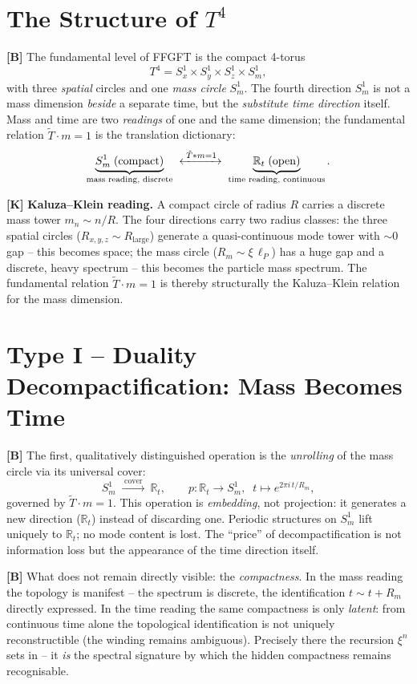 \section{The Structure of $T^4$}

\textbf{[B]} The fundamental level of FFGFT is the compact 4-torus
\[
  T^4 = S^1_x\times S^1_y\times S^1_z\times S^1_m,
\]
with three \emph{spatial} circles and one \emph{mass circle} $S^1_m$. The
fourth direction $S^1_m$ is not a mass dimension \emph{beside} a separate time,
but the \emph{substitute time direction} itself. Mass and time are two
\emph{readings} of one and the same dimension; the fundamental relation
$\tilde T\cdot m=1$ is the translation dictionary:
\[
  \underbrace{S^1_m\;(\text{compact})}_{\text{mass reading, discrete}}
  \;\xleftrightarrow{\;\tilde T\cdot m=1\;}\;
  \underbrace{\mathbb{R}_t\;(\text{open})}_{\text{time reading, continuous}}.
\]

\textbf{[K]} \textbf{Kaluza--Klein reading.} A compact circle of radius $R$
carries a discrete mass tower $m_n\sim n/R$. The four directions carry two radius
classes: the three spatial circles ($R_{x,y,z}\sim R_\text{large}$) generate a
quasi-continuous mode tower with $\sim0$ gap -- this becomes space; the mass
circle ($R_m\sim\xi\,\ell_P$) has a huge gap and a discrete, heavy spectrum --
this becomes the particle mass spectrum. The fundamental relation $\tilde T\cdot m=1$
is thereby structurally the Kaluza--Klein relation for the mass dimension.

\section{Type I -- Duality Decompactification: Mass Becomes Time}

\textbf{[B]} The first, qualitatively distinguished operation is the \emph{unrolling}
of the mass circle via its universal cover:
\[
  S^1_m\;\xrightarrow{\;\text{cover}\;}\ \mathbb{R}_t,
  \qquad p:\mathbb{R}_t\to S^1_m,\;\;t\mapsto e^{2\pi i\,t/R_m},
\]
governed by $\tilde T\cdot m=1$. This operation is \emph{embedding}, not
projection: it generates a new direction ($\mathbb{R}_t$) instead of discarding
one. Periodic structures on $S^1_m$ lift uniquely to $\mathbb{R}_t$; no mode
content is lost. The ``price'' of decompactification is not information loss but
the appearance of the time direction itself.

\textbf{[B]} What does not remain directly visible: the \emph{compactness}. In
the mass reading the topology is manifest -- the spectrum is discrete, the
identification $t\sim t+R_m$ directly expressed. In the time reading the same
compactness is only \emph{latent}: from continuous time alone the topological
identification is not uniquely reconstructible (the winding remains ambiguous).
Precisely there the recursion $\xi^n$ sets in -- it \emph{is} the spectral
signature by which the hidden compactness remains recognisable.

